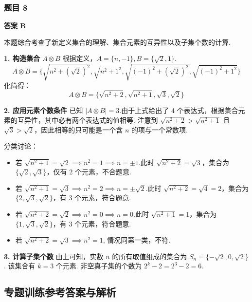 \subsubsection*{题目 8}
\begin{solution}
	\textbf{答案 B}
	
	本题综合考查了新定义集合的理解、集合元素的互异性以及子集个数的计算.
	
	\textbf{1. 构造集合 $A \otimes B$}
	根据定义，$A=\{n, -1\}, B=\{\sqrt{2}, 1\}$.
	\[ A \otimes B = \{\sqrt{n^2 + (\sqrt{2})^2}, \sqrt{n^2 + 1^2}, \sqrt{(-1)^2 + (\sqrt{2})^2}, \sqrt{(-1)^2 + 1^2}\} \]
	化简得：
	\[ A \otimes B = \{\sqrt{n^2+2}, \sqrt{n^2+1}, \sqrt{3}, \sqrt{2}\} \]
	
	\textbf{2. 应用元素个数条件}
	已知 $|A \otimes B| = 3$.由于上式给出了 4 个表达式，根据集合元素的互异性，其中必有两个表达式的值相等.
	注意到 $\sqrt{n^2+2} > \sqrt{n^2+1}$ 且 $\sqrt{3} > \sqrt{2}$，因此相等的只可能是一个含 $n$ 的项与一个常数项.
	
	分类讨论：
	\begin{itemize}
		\item 若 $\sqrt{n^2+1} = \sqrt{2} \implies n^2=1 \implies n=\pm 1$.此时 $\sqrt{n^2+2}=\sqrt{3}$，集合为 $\{\sqrt{2}, \sqrt{3}\}$，仅有 2 个元素，不合题意.
		\item 若 $\sqrt{n^2+1} = \sqrt{3} \implies n^2=2 \implies n=\pm \sqrt{2}$.此时 $\sqrt{n^2+2}=\sqrt{4}=2$，集合为 $\{2, \sqrt{3}, \sqrt{2}\}$，有 3 个元素，符合题意.
		\item 若 $\sqrt{n^2+2} = \sqrt{2} \implies n^2=0 \implies n=0$.此时 $\sqrt{n^2+1}=1$，集合为 $\{1, \sqrt{3}, \sqrt{2}\}$，有 3 个元素，符合题意.
		\item 若 $\sqrt{n^2+2} = \sqrt{3} \implies n^2=1$, 情况同第一类，不符.
	\end{itemize}
	
	\textbf{3. 计算子集个数}
	由上可知，实数 $n$ 的所有取值组成的集合为 $S_n = \{-\sqrt{2}, 0, \sqrt{2}\}$.
	该集合有 $k=3$ 个元素.
	非空真子集的个数为 $2^k - 2 = 2^3 - 2 = 6$.
\end{solution}

\subsection*{专题训练参考答案与解析}

